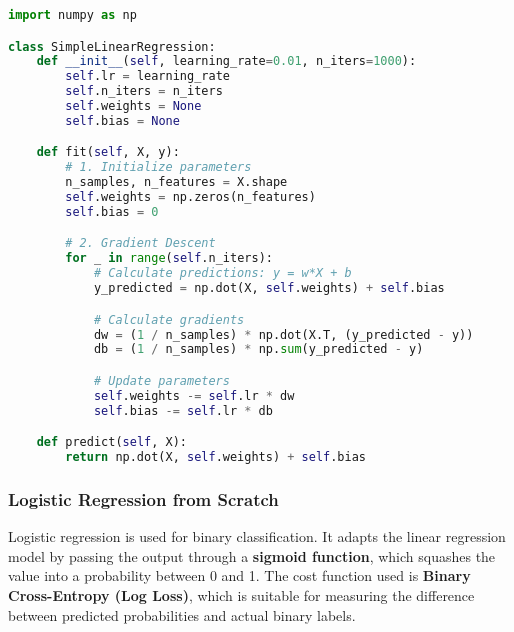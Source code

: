 \documentclass[11pt,a4paper]{article}
\begin{document}
\begin{lstlisting}[language=Python]
import numpy as np

class SimpleLinearRegression:
    def __init__(self, learning_rate=0.01, n_iters=1000):
        self.lr = learning_rate
        self.n_iters = n_iters
        self.weights = None
        self.bias = None

    def fit(self, X, y):
        # 1. Initialize parameters
        n_samples, n_features = X.shape
        self.weights = np.zeros(n_features)
        self.bias = 0

        # 2. Gradient Descent
        for _ in range(self.n_iters):
            # Calculate predictions: y = w*X + b
            y_predicted = np.dot(X, self.weights) + self.bias

            # Calculate gradients
            dw = (1 / n_samples) * np.dot(X.T, (y_predicted - y))
            db = (1 / n_samples) * np.sum(y_predicted - y)

            # Update parameters
            self.weights -= self.lr * dw
            self.bias -= self.lr * db

    def predict(self, X):
        return np.dot(X, self.weights) + self.bias
\end{lstlisting}

\subsubsection{Logistic Regression from Scratch}

Logistic regression is used for binary classification. It adapts the linear regression model by passing the output through a \textbf{sigmoid function}, which squashes the value into a probability between 0 and 1. The cost function used is \textbf{Binary Cross-Entropy (Log Loss)}, which is suitable for measuring the difference between predicted probabilities and actual binary labels.
\end{document}
